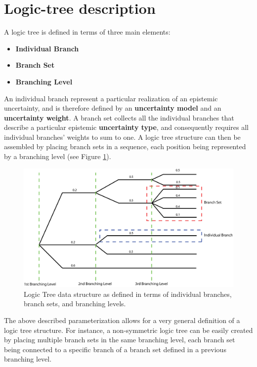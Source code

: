 %
\section{Logic-tree description}
\label{hazard:logic_tree}
A logic tree is defined in terms of three main elements:
\begin{itemize}
\item \textbf{Individual Branch}
\item \textbf{Branch Set}
\item \textbf{Branching Level}
\end{itemize}
An individual branch represent a particular realization of an epistemic uncertainty, and is therefore defined by an \textbf{uncertainty model} and an \textbf{uncertainty weight}. A branch set collects all the individual branches that describe a particular epistemic \textbf{uncertainty type}, and consequently  requires all individual branches' weights to sum to one. A logic tree structure can then be assembled by placing branch sets in a sequence, each position being represented by a branching level (see Figure \ref{fig:LogicTreeGeneralStructure}).
\begin{figure}
\includegraphics[width=15cm]{./Figures/Part_Hazard/LogicTreeGeneralStructure.eps}
\caption{Logic Tree data structure as defined in terms of individual branches, branch sets, and branching levels.}
\label{fig:LogicTreeGeneralStructure}
\end{figure}
The above described parameterization allows for a very general definition of a logic tree structure. For instance, a non-symmetric logic tree can be easily created by placing multiple branch sets in the same branching level, each branch set being connected to a specific branch of a branch set defined in a previous branching level.
